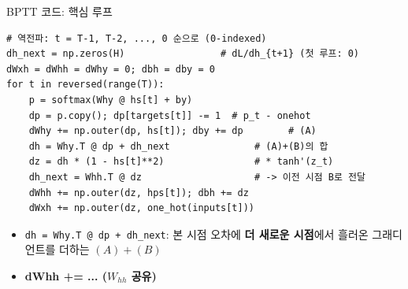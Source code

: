 \begin{frame}[fragile]{BPTT 코드: 핵심 루프}
\begin{lstlisting}
# 역전파: t = T-1, T-2, ..., 0 순으로 (0-indexed)
dh_next = np.zeros(H)                 # dL/dh_{t+1} (첫 루프: 0)
dWxh = dWhh = dWhy = 0; dbh = dby = 0
for t in reversed(range(T)):
    p = softmax(Why @ hs[t] + by)
    dp = p.copy(); dp[targets[t]] -= 1  # p_t - onehot
    dWhy += np.outer(dp, hs[t]); dby += dp        # (A)
    dh = Why.T @ dp + dh_next               # (A)+(B)의 합
    dz = dh * (1 - hs[t]**2)                # * tanh'(z_t)
    dh_next = Whh.T @ dz                    # -> 이전 시점 B로 전달
    dWhh += np.outer(dz, hps[t]); dbh += dz
    dWxh += np.outer(dz, one_hot(inputs[t]))
\end{lstlisting}
  \begin{itemize}
    \item {} \verb|dh = Why.T @ dp + dh_next|: 본 시점 오차에
      \textbf{더 새로운 시점}에서 흘러온 그래디언트를 더하는 $(A)+(B)$
    \item \textbf{dWhh += ... ($W_{hh}$ 공유)}
  \end{itemize}

\end{frame}
